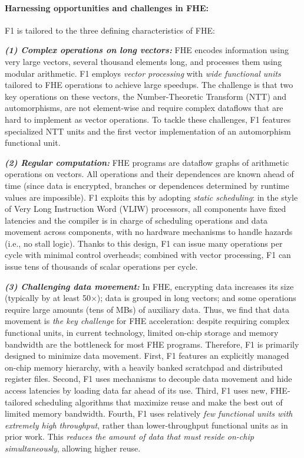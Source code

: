 \paragraph{Harnessing opportunities and challenges in FHE:}
F1 is tailored to the three defining characteristics of FHE:

\noindent \textbf{\emph{(1) Complex operations on long vectors:}}
FHE encodes information using very large vectors, several thousand elements long,
and processes them using modular arithmetic.
%
F1 employs \emph{vector processing} with \emph{wide functional units} tailored to FHE operations
to achieve large speedups.
The challenge is that two key operations on these vectors, the Number-Theoretic Transform (NTT) and automorphisms, are not element-wise and require complex dataflows that are hard to implement as vector operations. 
To tackle these challenges, F1 features specialized NTT units and the first vector implementation of an automorphism functional unit.

\noindent \textbf{\emph{(2) Regular computation:}}
FHE programs are dataflow graphs of arithmetic operations on vectors.
All operations and their dependences are known ahead of time (since data is encrypted, branches
or dependences determined by runtime values are impossible).
%
F1 exploits this by adopting \emph{static scheduling}:
in the style of Very Long Instruction Word (VLIW) processors,
all components have fixed latencies and the compiler is in charge of scheduling
operations and data movement across components, with no hardware mechanisms to handle hazards (i.e., no stall logic).
Thanks to this design, F1 can issue many operations per cycle with minimal control overheads;
combined with vector processing, F1 can issue tens of thousands of scalar operations per cycle. %

\noindent \textbf{\emph{(3) Challenging data movement:}}
In FHE, encrypting data increases its size (typically by at least 50$\times$);
data is grouped in long vectors; and some operations require large amounts (tens of MBs) of auxiliary data.
Thus, we find that data movement is \emph{the key challenge} for FHE acceleration:
despite requiring complex functional units, in current technology, limited on-chip storage and memory bandwidth are the bottleneck for most FHE programs.
%
Therefore, F1 is primarily designed to minimize data movement.
First, F1 features an explicitly managed on-chip memory hierarchy,
with a heavily banked scratchpad and distributed register files.
Second, F1 uses mechanisms to decouple data movement and hide access latencies by loading data far ahead of its use.
Third, F1 uses new, FHE-tailored scheduling algorithms that maximize reuse and make the best out of limited memory bandwidth.
Fourth, F1 uses relatively \emph{few functional units with extremely high throughput}, rather than lower-throughput functional units as in prior work.
This \emph{reduces the amount of data that must reside on-chip simultaneously}, allowing higher reuse.

